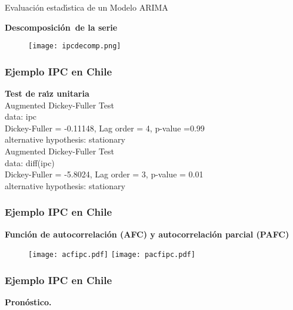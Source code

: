 \documentclass[spanish,xcolor=table]{beamer}
\begin{document}
\begin{section}{Evaluaci\'on estad\'{\i}stica de un Modelo ARIMA}
\begin{frame}
\textbf{Descomposici\'on\ de la serie}\\

\begin{figure}[t!]
\texttt{[image: ipcdecomp.png]}
\end{figure}
 
\end{frame}

\begin{frame}
\frametitle{Ejemplo IPC en Chile}

\textbf{Test de ra\'{\i}z unitaria}\\
\vspace{4mm}	
Augmented Dickey-Fuller Test\\
data:  ipc\\
Dickey-Fuller = -0.11148, Lag order = 4, p-value =0.99\\
alternative hypothesis: stationary\\
 \vspace{4mm}	
 Augmented Dickey-Fuller Test\\
data:  diff(ipc)\\
Dickey-Fuller = -5.8024, Lag order = 3, p-value = 0.01\\
alternative hypothesis: stationary\\

\end{frame}

\begin{frame}
\frametitle{Ejemplo IPC en Chile}

\textbf{Funci\'on de autocorrelaci\'on (AFC) y autocorrelaci\'on parcial (PAFC)}\\
\begin{figure}[t!]
\texttt{[image: acfipc.pdf]}
\texttt{[image: pacfipc.pdf]}
\end{figure}
 
\end{frame}

\begin{frame}
\frametitle{Ejemplo IPC en Chile}

\textbf{Pron\'ostico.}\\
 \vspace{4mm}	
\end{frame}
\end{section}
\end{document}
